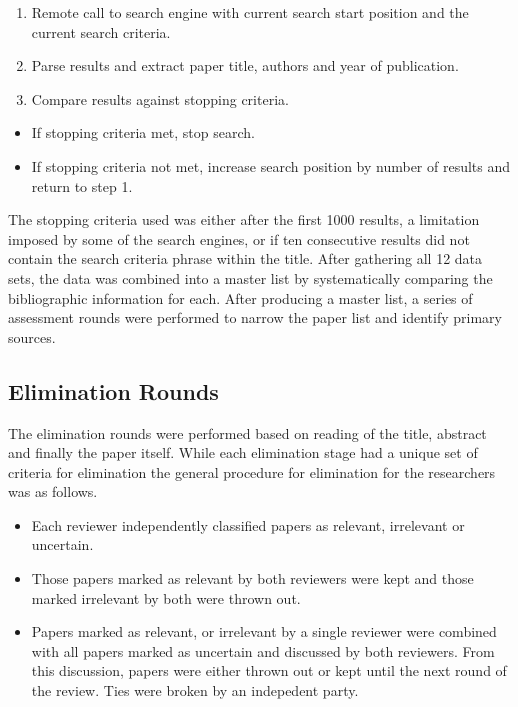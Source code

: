 \begin{enumerate}
\item Remote call to search engine with current search start position and the current search criteria.
\item Parse results and extract paper title, authors and year of publication.
\item Compare results against stopping criteria.
\end{enumerate}

\begin{itemize}
\item If stopping criteria met, stop search.
\item If stopping criteria not met, increase search position by number of results and return to step 1.
\end{itemize}

The stopping criteria used was either after the first 1000 results, a limitation imposed by some of the search engines, or if ten consecutive results did not contain the search criteria phrase within the title.  After gathering all 12 data sets, the data was combined into a master list by systematically comparing the bibliographic information for each.  After producing a master list, a series of assessment rounds were performed to narrow the paper list and identify primary sources.

\subsection{Elimination Rounds}

The elimination rounds were performed based on reading of the title, abstract and finally the paper itself.  While each elimination stage had a unique set of criteria for elimination the general procedure for elimination for the researchers was as follows.

\begin{itemize}
\item Each reviewer independently classified papers as relevant, irrelevant or uncertain.
\item Those papers marked as relevant by both reviewers were kept and those marked irrelevant by both were thrown out.
\item Papers marked as relevant, or irrelevant by a single reviewer were combined with all papers marked as uncertain and discussed by both reviewers.  From this discussion, papers were either thrown out or kept until the next round of the review.  Ties were broken by an indepedent party.
\end{itemize}

